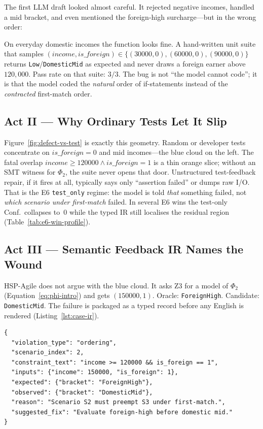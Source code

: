The first LLM draft looked almost careful.
It rejected negative incomes, handled a mid bracket, and even mentioned the
foreign-high surcharge---but in the wrong order:


On everyday domestic incomes the function looks fine.
A hand-written unit suite that samples
$(\mathit{income},\mathit{is\_foreign})\in\{(30000,0),(60000,0),(90000,0)\}$
returns \texttt{Low}/\texttt{DomesticMid} as expected and never draws a
foreign earner above $120{,}000$.
Pass rate on that suite: $3/3$.
The bug is not ``the model cannot code''; it is that the model coded the
\emph{natural} order of if-statements instead of the \emph{contracted}
first-match order.

\subsection*{Act II --- Why Ordinary Tests Let It Slip}

Figure~\ref{fig:defect-vs-test} is exactly this geometry.
Random or developer tests concentrate on $\mathit{is\_foreign}{=}0$ and mid
incomes---the blue cloud on the left.
The fatal overlap
$\mathit{income}{\ge}120000 \wedge \mathit{is\_foreign}{=}1$ is a thin
orange slice; without an SMT witness for $\Phi_2$, the suite never opens
that door.
Unstructured test-feedback repair, if it fires at all, typically says only
``assertion failed'' or dumps raw I/O.
That is the E6 \texttt{test\_only} regime: the model is told \emph{that}
something failed, not \emph{which scenario under first-match} failed.
In several E6 wins the test-only Conf.\ collapses to~$0$ while the typed IR
still localises the residual region
(Table~\ref{tab:e6-win-profile}).

\subsection*{Act III --- Semantic Feedback IR Names the Wound}

HSP-Agile does not argue with the blue cloud.
It asks Z3 for a model of $\Phi_2$
(Equation~\eqref{eq:phi-intro}) and gets $(150000,1)$.
Oracle: \texttt{ForeignHigh}. Candidate: \texttt{DomesticMid}.
The failure is packaged as a typed record before any English is rendered
(Listing~\ref{lst:case-ir}).

\begin{lstlisting}[language={},basicstyle=\ttfamily\footnotesize,frame=single,
  caption={Semantic Feedback IR for the foreign-high miss (abbreviated).},
  label={lst:case-ir}]
{
  "violation_type": "ordering",
  "scenario_index": 2,
  "constraint_text": "income >= 120000 && is_foreign == 1",
  "inputs": {"income": 150000, "is_foreign": 1},
  "expected": {"bracket": "ForeignHigh"},
  "observed": {"bracket": "DomesticMid"},
  "reason": "Scenario S2 must preempt S3 under first-match.",
  "suggested_fix": "Evaluate foreign-high before domestic mid."
}
\end{lstlisting}

